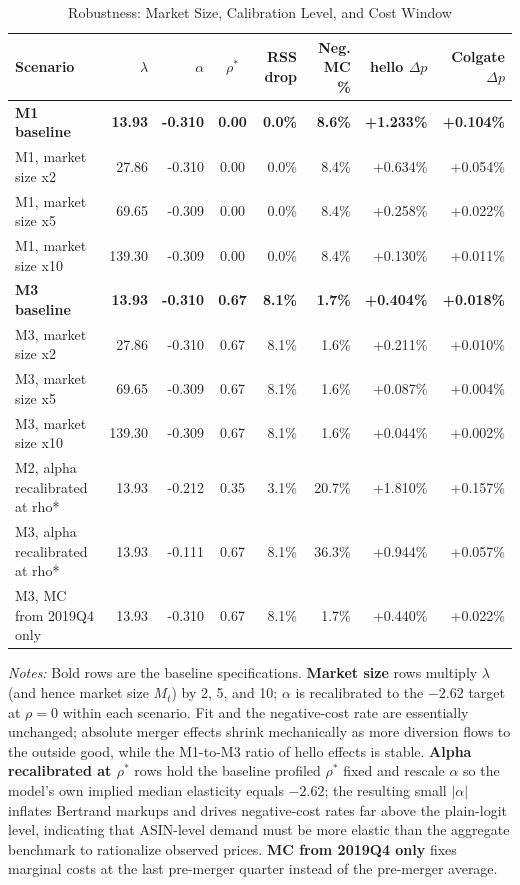 \begin{table}[H]
\centering
\caption{\label{tab:appendix_robustness}Robustness: Market Size, Calibration Level, and Cost Window}
\centering
\fontsize{8}{10}\selectfont
\begin{tabular}[t]{lrrcrrrr}
\toprule
Scenario & $\lambda$ & $\alpha$ & $\rho^*$ & RSS drop & Neg. MC \% & hello $\Delta p$ & Colgate $\Delta p$\\
\midrule
\textbf{M1 baseline} & \textbf{13.93} & \textbf{-0.310} & \textbf{0.00} & \textbf{0.0\%} & \textbf{8.6\%} & \textbf{+1.233\%} & \textbf{+0.104\%}\\
M1, market size x2 & 27.86 & -0.310 & 0.00 & 0.0\% & 8.4\% & +0.634\% & +0.054\%\\
M1, market size x5 & 69.65 & -0.309 & 0.00 & 0.0\% & 8.4\% & +0.258\% & +0.022\%\\
M1, market size x10 & 139.30 & -0.309 & 0.00 & 0.0\% & 8.4\% & +0.130\% & +0.011\%\\
\textbf{M3 baseline} & \textbf{13.93} & \textbf{-0.310} & \textbf{0.67} & \textbf{8.1\%} & \textbf{1.7\%} & \textbf{+0.404\%} & \textbf{+0.018\%}\\
\addlinespace
M3, market size x2 & 27.86 & -0.310 & 0.67 & 8.1\% & 1.6\% & +0.211\% & +0.010\%\\
M3, market size x5 & 69.65 & -0.309 & 0.67 & 8.1\% & 1.6\% & +0.087\% & +0.004\%\\
M3, market size x10 & 139.30 & -0.309 & 0.67 & 8.1\% & 1.6\% & +0.044\% & +0.002\%\\
M2, alpha recalibrated at rho* & 13.93 & -0.212 & 0.35 & 3.1\% & 20.7\% & +1.810\% & +0.157\%\\
M3, alpha recalibrated at rho* & 13.93 & -0.111 & 0.67 & 8.1\% & 36.3\% & +0.944\% & +0.057\%\\
\addlinespace
M3, MC from 2019Q4 only & 13.93 & -0.310 & 0.67 & 8.1\% & 1.7\% & +0.440\% & +0.022\%\\
\bottomrule
\end{tabular}
\end{table}

\emph{Notes:} Bold rows are the baseline specifications. \textbf{Market
size} rows multiply \(\lambda\) (and hence market size \(M_t\)) by 2, 5,
and 10; \(\alpha\) is recalibrated to the \(-2.62\) target at \(\rho=0\)
within each scenario. Fit and the negative-cost rate are essentially
unchanged; absolute merger effects shrink mechanically as more diversion
flows to the outside good, while the M1-to-M3 ratio of hello effects is
stable. \textbf{Alpha recalibrated at \(\rho^{*}\)} rows hold the
baseline profiled \(\rho^{*}\) fixed and rescale \(\alpha\) so the
model's own implied median elasticity equals \(-2.62\); the resulting
small \(|\alpha|\) inflates Bertrand markups and drives negative-cost
rates far above the plain-logit level, indicating that ASIN-level demand
must be more elastic than the aggregate benchmark to rationalize
observed prices. \textbf{MC from 2019Q4 only} fixes marginal costs at
the last pre-merger quarter instead of the pre-merger average.

